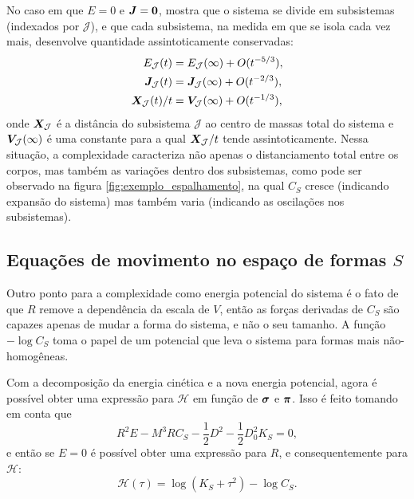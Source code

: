 No caso em que $E=0$ e $\bm J = \bm 0$, \cite{Marchal1976} mostra que o sistema se divide em subsistemas (indexados por $\mathcal J$), e que cada subsistema, na medida em que se isola cada vez mais, desenvolve quantidade assintoticamente conservadas:
\begin{align*}
    E_{\mathcal J} (t) &= E_{\mathcal J} (\infty) + O(t^{-5/3}),\\
    \bm J_{\mathcal J} (t) &= \bm J_{\mathcal J} (\infty) + O(t^{-2/3}),\\
    \bm X_{\mathcal J} (t) / t &= \bm V_{\mathcal J} (\infty) + O(t^{-1/3}),
\end{align*}
onde $\bm X_{\mathcal J}$ é a distância do subsistema $\mathcal J$ ao centro de massas total do sistema e $\bm V_{\mathcal J} (\infty)$ é uma constante para a qual $\bm X_{\mathcal J}/t$ tende assintoticamente. Nessa situação, a complexidade caracteriza não apenas o distanciamento total entre os corpos, mas também as variações dentro dos subsistemas, como pode ser observado na figura \ref{fig:exemplo_espalhamento}, na qual $C_S$ cresce (indicando expansão do sistema) mas também varia (indicando as oscilações nos subsistemas).


\subsection{Equações de movimento no espaço de formas $S$}

Outro ponto para a complexidade como energia potencial do sistema é o fato de que $R$ remove a dependência da escala de $V$, então as forças derivadas de $C_S$ são capazes apenas de mudar a forma do sistema, e não o seu tamanho. A função $-\log C_S$ toma o papel de um potencial que leva o sistema para formas mais não-homogêneas.


Com a decomposição da energia cinética e a nova energia potencial, agora é possível obter uma expressão para $\mathcal H$ em função de $\bm \sigma$ e $\bm \pi$. Isso é feito tomando em conta que
\begin{equation*}
    R^2 E - M^3 R C_S - \frac{1}{2} D^2 - \frac{1}{2} D_0^2 K_S = 0,
\end{equation*}
e então se $E = 0$ é possível obter uma expressão para $R$, e consequentemente para $\mathcal H$:
\begin{equation}\label{eq:hamiltoniano_tau_dependente}
    \mathcal H (\tau) = \log{(K_S + \tau^2)} - \log{C_S}.
\end{equation}

